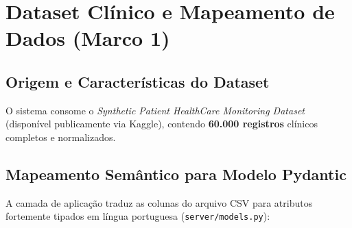 \documentclass[12pt,a4paper]{article}
\begin{document}
\section{Dataset Clínico e Mapeamento de Dados (Marco 1)}

\subsection{Origem e Características do Dataset}
O sistema consome o \textit{Synthetic Patient HealthCare Monitoring Dataset} (disponível publicamente via Kaggle), contendo \textbf{60.000 registros} clínicos completos e normalizados.

\subsection{Mapeamento Semântico para Modelo Pydantic}
A camada de aplicação traduz as colunas do arquivo CSV para atributos fortemente tipados em língua portuguesa (\texttt{server/models.py}):
\end{document}
